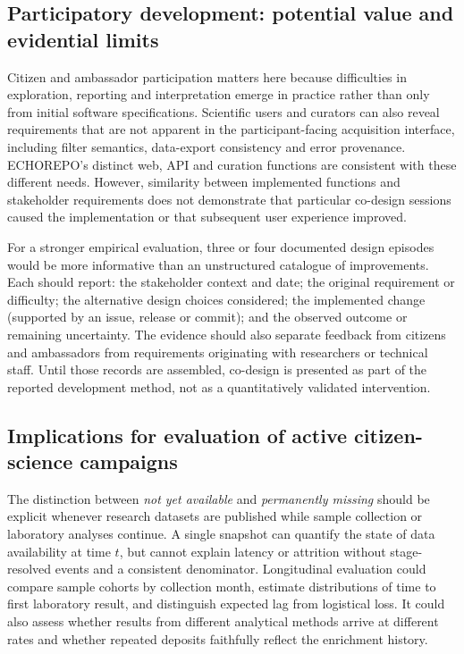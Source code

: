 \documentclass[11pt,a4paper]{article}
\begin{document}
\subsection{Participatory development: potential value and evidential limits}
Citizen and ambassador participation matters here because difficulties in exploration, reporting and interpretation emerge in practice rather than only from initial software specifications. Scientific users and curators can also reveal requirements that are not apparent in the participant-facing acquisition interface, including filter semantics, data-export consistency and error provenance. ECHOREPO's distinct web, API and curation functions are consistent with these different needs. However, similarity between implemented functions and stakeholder requirements does not demonstrate that particular co-design sessions caused the implementation or that subsequent user experience improved.

For a stronger empirical evaluation, three or four documented design episodes would be more informative than an unstructured catalogue of improvements. Each should report: the stakeholder context and date; the original requirement or difficulty; the alternative design choices considered; the implemented change (supported by an issue, release or commit); and the observed outcome or remaining uncertainty. The evidence should also separate feedback from citizens and ambassadors from requirements originating with researchers or technical staff. Until those records are assembled, co-design is presented as part of the reported development method, not as a quantitatively validated intervention.

\subsection{Implications for evaluation of active citizen-science campaigns}
The distinction between \emph{not yet available} and \emph{permanently missing} should be explicit whenever research datasets are published while sample collection or laboratory analyses continue. A single snapshot can quantify the state of data availability at time $t$, but cannot explain latency or attrition without stage-resolved events and a consistent denominator. Longitudinal evaluation could compare sample cohorts by collection month, estimate distributions of time to first laboratory result, and distinguish expected lag from logistical loss. It could also assess whether results from different analytical methods arrive at different rates and whether repeated deposits faithfully reflect the enrichment history.
\end{document}
